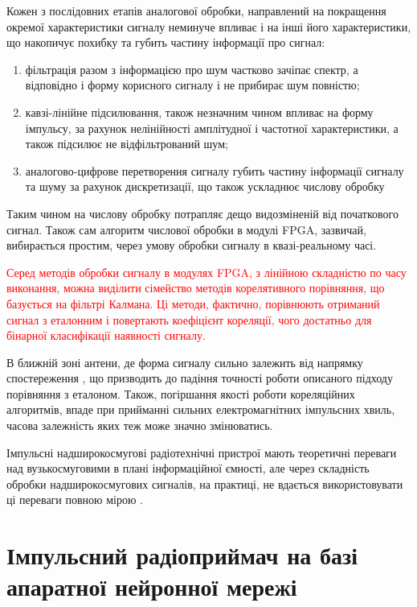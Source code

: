 Кожен з послідовних етапів аналогової обробки, направлений на покращення 
окремої характеристики сигналу неминуче впливає і на інші його характеристики,
що накопичує похибку та губить частину інформації про сигнал:

\begin{enumerate}
	\item фільтрація разом з інформацією про шум частково зачіпає спектр, 
	а відповідно і форму корисного сигналу і не прибирає шум повністю;
	\item кавзі-лінійне підсилювання, також незначним чином впливає на 
	форму імпульсу, за рахунок нелінійності амплітудної і частотної 
	характеристики, а також підсилює не відфільтрований шум;
	\item аналогово-цифрове перетворення сигналу губить частину інформації 
	сигналу та шуму за рахунок дискретизації, що також ускладнює числову 
	обробку
\end{enumerate}

Таким чином на числову обробку потрапляє дещо видозміненій від початкового
сигнал. Також сам алгоритм числової обробки в модулі FPGA, зазвичай,
вибирається простим, через умову обробки сигналу в квазі-реальному часі.

\textcolor{red}{
Серед методів обробки сигналу в модулях FPGA, з лінійною складністю по часу 
виконання, можна виділити сімейство методів корелятивного порівняння, що 
базується на фільтрі Калмана. Ці методи, фактично, порівнюють отриманий сигнал 
з еталонним і повертають коефіцієнт кореляції, чого достатньо для бінарної
класифікації наявності сигналу. }

В ближній зоні антени, де форма сигналу сильно залежить від напрямку 
спостереження \cite{imp:Wu1985, imp:Sodin1992-10, my:Telecom2018}, що призводить 
до падіння точності роботи описаного підходу порівняння з еталоном. Також, 
погіршання якості роботи кореляційних алгоритмів, впаде при прийманні сильних 
електромагнітних імпульсних хвиль, часова залежність яких теж може значно 
змінюватись.

Імпульсні надширокосмугові радіотехнічні пристрої мають теоретичні переваги 
над вузькосмуговими в плані інформаційної ємності, але через складність 
обробки надширокосмугових сигналів, на практиці, не вдається використовувати 
ці переваги повною мірою \cite{imp:ChannelLimitations}.

\section{Імпульсний радіоприймач на базі апаратної нейронної мережі}

